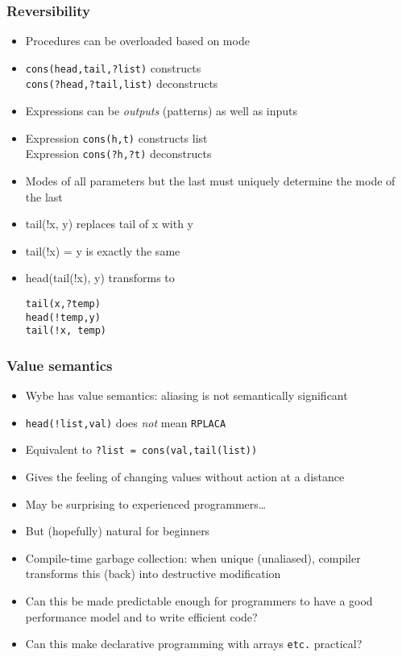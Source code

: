 \documentclass[12pt]{beamer}
\begin{document}
\begin{frame}
\frametitle{Reversibility}
\begin{itemize}
\item Procedures can be overloaded based on mode
\item \texttt{cons(head,tail,?list)}  constructs \\
\texttt{cons(?head,?tail,list)}  deconstructs \\
\item Expressions can be \emph{outputs} (patterns) as well as inputs
\item Expression \texttt{cons(h,t)} constructs list \\
Expression \texttt{cons(?h,?t)} deconstructs
\item Modes of all parameters but the last must uniquely determine the
  mode of the last
\item tail(!x, y) replaces tail of x with y
\item tail(!x) = y is exactly the same
\item head(tail(!x), y) \quad transforms to \quad
  \begin{minipage}[c]{0.4\linewidth}
  \texttt{tail(x,?temp)} \\
  \texttt{head(!temp,y)} \\
  \texttt{tail(!x, temp)}
  \end{minipage}
\end{itemize}
\end{frame}


\begin{frame}
\frametitle{Value semantics}
\begin{itemize}
\item Wybe has value semantics:  aliasing is not semantically significant
\item \texttt{head(!list,val)} does \emph{not} mean \texttt{RPLACA}
\item Equivalent to \texttt{?list = cons(val,tail(list))}
\item Gives the feeling of changing values without action at a distance
\item May be surprising to experienced programmers\ldots
\item But (hopefully) natural for beginners
\item Compile-time garbage collection:  when unique (unaliased),
  compiler transforms this (back) into destructive modification
\item Can this be made predictable enough for programmers
  to have a good performance model and to write efficient code?
\item Can this make declarative programming with arrays \texttt{etc.} practical?
\end{itemize}
\end{frame}
\end{document}
